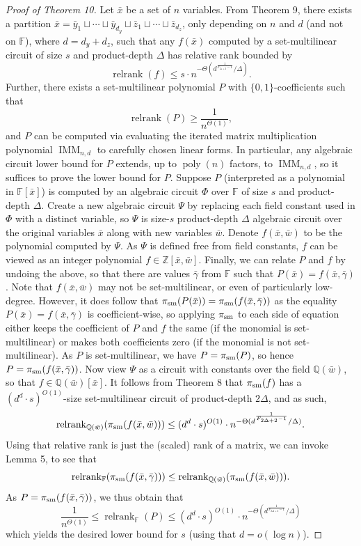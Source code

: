 \documentclass[10pt,a4paper]{article}
\begin{document}
\begin{proof}[Proof of Theorem 10]
Let $\bar x$ be a set of $n$ variables. From Theorem 9, there exists a partition $\bar x=\bar y_1\sqcup\cdots\sqcup\bar y_{d_y}\sqcup\bar z_1\sqcup\cdots\sqcup\bar z_{d_z}$, only depending on $n$ and $d$ (and not on $\mathbb F$), where $d=d_y+d_z$, such that any $f(\bar x)$ computed by a set-multilinear circuit of size $s$ and product-depth $\Delta$ has relative rank bounded by
\[\operatorname{relrank}(f)\le s\cdot n^{-\Theta(d^{\frac1{F_{\Delta+2}-1}}/\Delta)}.\]
Further, there exists a set-multilinear polynomial $P$ with $\{0,1\}$-coefficients such that
\[\operatorname{relrank}(P)\ge\frac1{n^{\Theta(1)}},\]
and $P$ can be computed via evaluating the iterated matrix multiplication polynomial $\operatorname{IMM}_{n,d}$ to carefully chosen linear forms. In particular, any algebraic circuit lower bound for $P$ extends, up to $\operatorname{poly}(n)$ factors, to $\operatorname{IMM}_{n,d}$, so it suffices to prove the lower bound for $P$.
Suppose $P$ (interpreted as a polynomial in $\mathbb F[\bar x]$) is computed by an algebraic circuit $\Phi$ over $\mathbb F$ of size $s$ and product-depth $\Delta$. Create a new algebraic circuit $\Psi$ by replacing each field constant used in $\Phi$ with a distinct variable, so $\Psi$ is size-$s$ product-depth $\Delta$ algebraic circuit over the original variables $\bar x$ along with new variables $\bar w$. Denote $f(\bar x,\bar w)$ to be the polynomial computed by $\Psi$. As $\Psi$ is defined free from field constants, $f$ can be viewed as an integer polynomial $f\in\mathbb Z[\bar x,\bar w]$. Finally, we can relate $P$ and $f$ by undoing the above, so that there are values $\bar\gamma$ from $\mathbb F$ such that $P(\bar x)=f(\bar x,\bar\gamma)$.
Note that $f(\bar x,\bar w)$ may not be set-multilinear, or even of particularly low-degree. However, it does follow that $\pi_{\rm sm}(P(\bar x))=\pi_{\rm sm}(f(\bar x,\bar\gamma))$ as the equality $P(\bar x)=f(\bar x,\bar\gamma)$ is coefficient-wise, so applying $\pi_{\rm sm}$ to each side of equation either keeps the coefficient of $P$ and $f$ the same (if the monomial is set-multilinear) or makes both coefficients zero (if the monomial is not set-multilinear). As $P$ is set-multilinear, we have $P=\pi_{\rm sm}(P)$, so hence $P=\pi_{\rm sm}(f(\bar x,\bar\gamma))$.
Now view $\Psi$ as a circuit with constants over the field $\mathbb Q(\bar w)$, so that $f\in\mathbb Q(\bar w)[\bar x]$. It follows from Theorem 8 that $\pi_{\rm sm}(f)$ has a $(d^d\cdot s)^{O(1)}$-size set-multilinear circuit of product-depth $2\Delta$, and as such,
\[\operatorname{relrank}_{\mathbb Q(\bar w)}(\pi_{\rm sm}(f(\bar x,\bar w)))\le(d^d\cdot s)^{O(1)}\cdot n^{-\Theta(d^{\frac1{F_{2\Delta+2}-1}}/\Delta)}.\]
Using that relative rank is just the (scaled) rank of a matrix, we can invoke Lemma 5, to see that
\[\operatorname{relrank}_{\mathbb F}(\pi_{\rm sm}(f(\bar x,\bar\gamma)))\le\operatorname{relrank}_{\mathbb Q(\bar w)}(\pi_{\rm sm}(f(\bar x,\bar w))).\]
As $P=\pi_{\rm sm}(f(\bar x,\bar\gamma))$, we thus obtain that
\[\frac1{n^{\Theta(1)}}\le\operatorname{relrank}_{\mathbb F}(P)\le(d^d\cdot s)^{O(1)}\cdot n^{-\Theta(d^{\frac1{F_{2\Delta+2}-1}}/\Delta)}\]
which yields the desired lower bound for $s$ (using that $d=o(\log n)$).
\end{proof}
\end{document}
